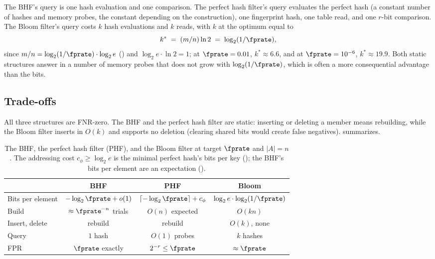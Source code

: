 The BHF's query is one hash evaluation and one comparison. The perfect
hash filter's query evaluates the perfect hash (a constant number of
hashes and memory probes, the constant depending on the construction),
one fingerprint hash, one table read, and one $r$-bit comparison. The
Bloom filter's query costs $k$ hash evaluations and $k$ reads, with $k$
at the optimum equal to
\[
  k^{*} \;=\; (m/n) \ln 2 \;=\; \log_2(1/\fprate),
\]
since $m/n = \log_2(1/\fprate) \cdot \log_2 e$ ()
and $\log_2 e \cdot \ln 2 = 1$; at $\fprate = 0.01$, $k^{*} \approx 6.6$,
and at $\fprate = 10^{-6}$, $k^{*} \approx 19.9$. Both static structures
answer in a number of memory probes that does not grow with
$\log_2(1/\fprate)$, which is often a more consequential advantage than
the bits.

\subsection*{Trade-offs}

All three structures are FNR-zero. The BHF and the perfect hash filter
are static: inserting or deleting a member means rebuilding, while the
Bloom filter inserts in $O(k)$ and supports no deletion (clearing shared
bits would create false negatives). 
summarizes.

\begin{table}[h]
\centering
\small
\caption{The BHF, the perfect hash filter (PHF), and the Bloom filter at
target $\fprate$ and $|A| = n$. The addressing cost $c_\phi \ge \log_2 e$
is the minimal perfect hash's bits per key (); the
BHF's bits per element are an expectation ().}
\label{tab:bhf-bloom-tradeoffs}
\begin{tabular}{l|ccc}
\hline
  & BHF & PHF & Bloom \\
\hline
  Bits per element  & $-\log_2 \fprate + o(1)$
                    & $\lceil -\log_2 \fprate \rceil + c_\phi$
                    & $\log_2 e \cdot \log_2(1/\fprate)$ \\
  Build             & $\approx \fprate^{-n}$ trials
                    & $O(n)$ expected
                    & $O(kn)$ \\
  Insert, delete    & rebuild & rebuild & $O(k)$, none \\
  Query             & $1$ hash & $O(1)$ probes & $k$ hashes \\
  FPR               & $\fprate$ exactly & $2^{-r} \le \fprate$
                    & $\approx \fprate$ \\
\hline
\end{tabular}
\end{table}

